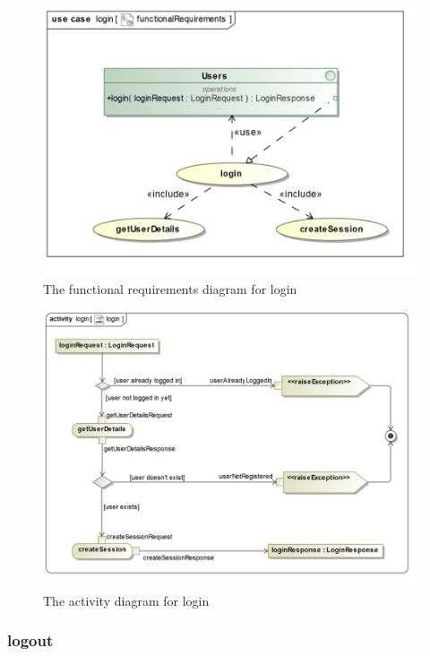 \begin{figure}[H]
	\centering
	\includegraphics[width=1.1\textwidth]{../images/funcReq/loginFunctionalRequirements.jpg}
	\caption{The functional requirements diagram for login \label{overflow}}
\end{figure}

\begin{figure}[H]
	\centering
	\includegraphics[width=1.1\textwidth]{../images/funcReq/loginActivityDiagram.jpg}
	\caption{The activity diagram for login \label{overflow}}
\end{figure}

\subsubsection{logout}

